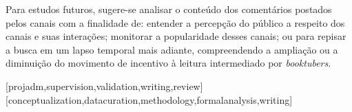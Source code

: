 \documentclass[portuguese]{textolivre}
\begin{document}
Para estudos futuros, sugere-se analisar o conteúdo dos comentários
postados pelos canais com a finalidade de: entender a percepção do
público a respeito dos canais e suas interações; monitorar a
popularidade desses canais; ou para repisar a busca em um lapso temporal
mais adiante, compreendendo a ampliação ou a diminuição do movimento de
incentivo à leitura intermediado por \emph{booktubers}.





\printbibliography\label{sec-bib}


\begin{contributors}
[projadm,supervision,validation,writing,review]
[conceptualization,datacuration,methodology,formalanalysis,writing]
\end{contributors}
\end{document}
